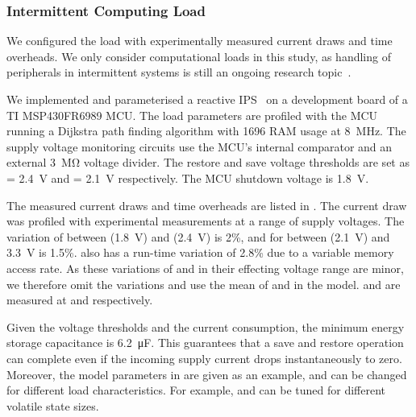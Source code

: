 
\subsubsection{Intermittent Computing Load} \label{ssubsec:loadconfig}

We configured the load with experimentally measured current draws and time overheads.
We only consider computational loads in this study, as handling of peripherals in intermittent systems is still an ongoing research topic~\cite{rodriguez2018restop, Maeng:2019:SPI:3314221.3314613}. 

We implemented and parameterised a reactive IPS~\cite{balsamo2015hibernus} on a development board of a TI MSP430FR6989 MCU. 
The load parameters are profiled with the MCU running a Dijkstra path finding algorithm with \SI{1696}{\byte} RAM usage at \SI{8}{\mega\hertz}. 
The supply voltage monitoring circuits use the MCU's internal comparator and an external \SI{3}{\mega\ohm} voltage divider. 
The restore and save voltage thresholds are set as  = \SI{2.4}{\volt} and  = \SI{2.1}{\volt} respectively. 
The MCU shutdown voltage  is \SI{1.8}{\volt}. 

The measured current draws and time overheads are listed in .
The current draw was profiled with experimental measurements at a range of supply voltages. 
The variation of  between  (\SI{1.8}{\volt}) and  (\SI{2.4}{\volt}) is 2\%, and for  between  (\SI{2.1}{\volt}) and \SI{3.3}{\volt} is 1.5\%. 
 also has a run-time variation of 2.8\% due to a variable memory access rate. 
As these variations of  and  in their effecting voltage range are minor, we therefore omit the variations and use the mean of  and  in the model. 
 and  are measured at  and  respectively. 

Given the voltage thresholds and the current consumption, the minimum energy storage capacitance is \SI{6.2}{\micro\farad}. 
This guarantees that a save and restore operation can complete even if the incoming supply current drops instantaneously to zero. 
Moreover, the model parameters in  are given as an example, and can be changed for different load characteristics. 
For example,  and  can be tuned for different volatile state sizes.

